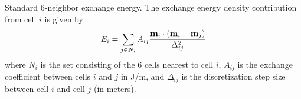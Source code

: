 \begin{description}
%
\item[Oxs\_Exchange6Ngbr:]
   Standard 6-neighbor exchange energy.  The
   exchange energy density contribution from cell $i$ is given by
   \begin{equation}
        E_i =  \sum_{j\in N_i} A_{ij}
         \frac{\textbf{m}_i\cdot\left(\textbf{m}_i - \textbf{m}_j\right)}{\Delta_{ij}^2}
   \label{eq:ExchangeEnergy}
   \end{equation}
   where $N_i$ is the set consisting of the 6 cells nearest to cell $i$,
   $A_{ij}$ is the exchange coefficient between cells $i$ and $j$ in J/m,
   and $\Delta_{ij}$ is the discretization step size between cell $i$ and
   cell $j$ (in meters).


\end{description}
